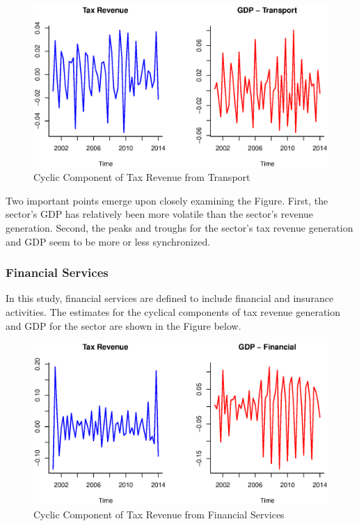 \documentclass[12pt,a4paper,final]{article}
\begin{document}
\begin{figure}[h]
\centering
\begin{small}
\caption{Cyclic Component of Tax Revenue from Transport}
\end{small}
\includegraphics[scale=0.501]{transport.eps} 
\end{figure}

Two important points emerge upon closely examining the Figure. First, the sector's GDP has relatively been more volatile than the sector's revenue generation. Second, the peaks and troughs for the sector's tax revenue generation and GDP seem to be more or less synchronized.


\subsubsection{Financial Services}

In this study, financial services are defined to include financial and insurance activities.  The estimates for the cyclical components of tax revenue generation and GDP for the sector are shown in the Figure below.

\begin{figure}[h]
\centering
\begin{small}
\caption{Cyclic Component of Tax Revenue from Financial Services}
\end{small}
\includegraphics[scale=0.501]{financial.eps} 
\end{figure}
\end{document}
